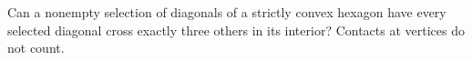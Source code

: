 Can a nonempty selection of diagonals of a strictly convex hexagon have every selected diagonal cross exactly three others in its interior? Contacts at vertices do not count.
